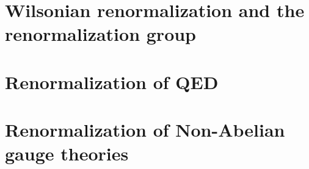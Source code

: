 \documentclass[../QFT_main.tex]{subfiles}
\begin{document}
\section{Wilsonian renormalization and the renormalization group}



\section{Renormalization of QED}


\section{Renormalization of Non-Abelian gauge theories}
\end{document}
